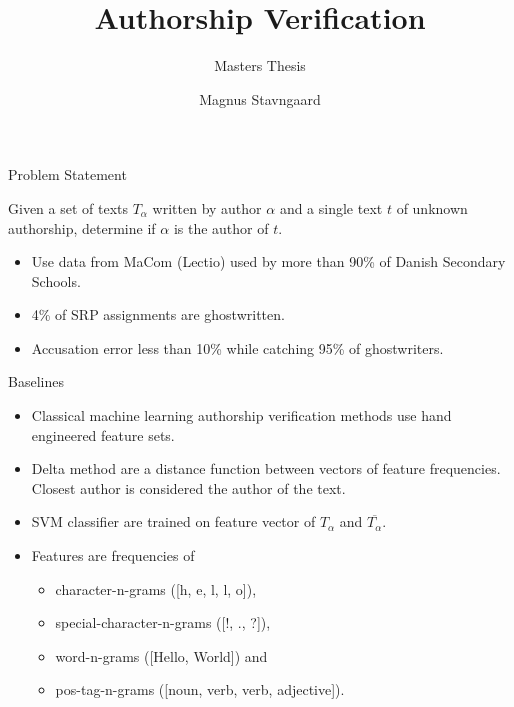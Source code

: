 \documentclass[10pt]{beamer}
\title{Authorship Verification}
\subtitle{Masters Thesis}
\date{}
\author{Magnus Stavngaard}
\institute{University of Copenhagen}
\begin{document}
\maketitle

\begin{frame}[fragile]{Problem Statement}
    \begin{definition}
        \label{def:authorship_verification}

        Given a set of texts $T_\alpha$ written by author $\alpha$ and a
        single text $t$ of unknown authorship, determine if $\alpha$ is
        the author of $t$.

    \end{definition}

    \begin{itemize}
        \item Use data from MaCom (Lectio) used by more than 90\% of Danish
            Secondary Schools.
        \item 4\% of SRP assignments are ghostwritten.
        \item Accusation error less than 10\% while catching 95\% of
            ghostwriters.
    \end{itemize}
\end{frame}

\begin{frame}[fragile]{Baselines}
    \begin{itemize}
        \item Classical machine learning authorship verification methods use
            hand engineered feature sets.
        \item Delta method are a distance function between vectors of feature
            frequencies. Closest author is considered the author of the text.
        \item SVM classifier are trained on feature vector of $T_\alpha$ and
            $\overline{T_\alpha}$.
        \item Features are frequencies of
            \begin{itemize}
                \item character-n-grams ([h, e, l, l, o]),
                \item special-character-n-grams ([!, ., ?]),
                \item word-n-grams ([Hello, World]) and
                \item pos-tag-n-grams ([noun, verb, verb, adjective]).
            \end{itemize}
    \end{itemize}
\end{frame}
\end{document}
